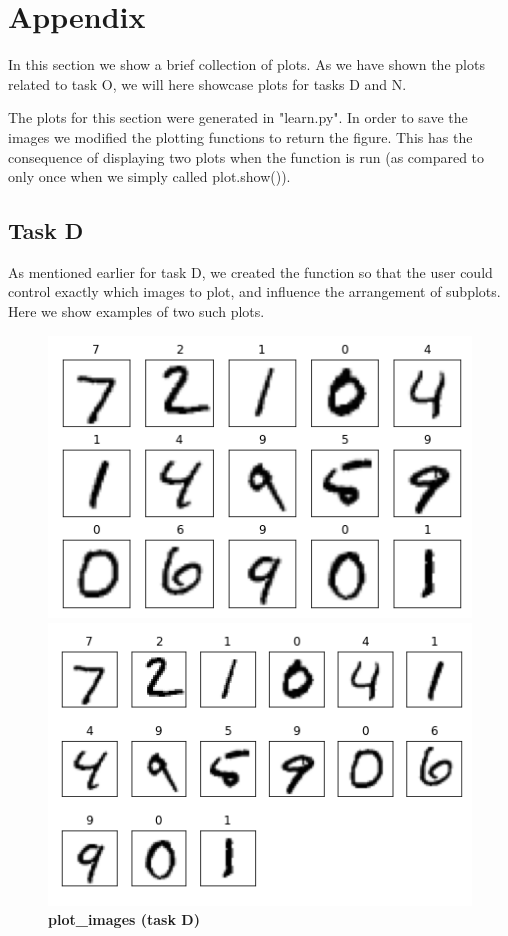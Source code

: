 \documentclass[letterpaper, 12 pt, conference]{ieeeconf}
\begin{document}
\newpage
\section{Appendix}

In this section we show a brief collection of plots. 
As we have shown the plots related to task O, 
we will here showcase plots for tasks D and N. 

The plots for this section were generated in 
"learn.py". In order to save the images we modified 
the plotting functions to return the figure. This has 
the consequence of displaying two plots when the 
function is run (as compared to only once when
we simply called plot.show()). 

\subsection{Task D}

As mentioned earlier for task D, we created the function
so that the user could control exactly which images to
plot, and influence the arrangement of subplots. 
Here we show examples of two such plots. 


\begin{figure}[h]
\centering
\caption{\textbf{plot\_images (task D)}}
\includegraphics[scale=0.4]{"../images/appendix_plot_images_5_cols"}

\includegraphics[scale=0.4]{"../images/appendix_plot_images_6_cols"}
\end{figure}
\end{document}
